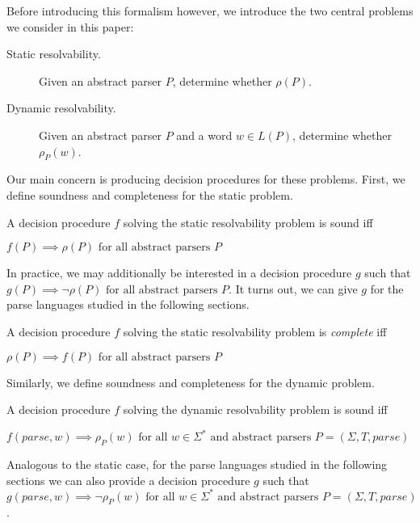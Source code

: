 \documentclass[acmsmall,review,anonymous]{acmart}\settopmatter{printfolios=true,printccs=false,printacmref=false}
\newcommand{\T}{\Sigma} %
\newcommand{\parse}{\mathit{parse}} %
\begin{document}
Before introducing this formalism however, we introduce the two central problems we consider in this paper:

\begin{description}
\item[Static resolvability.] Given an abstract parser $P$, determine whether $\rho(P)$.
\item[Dynamic resolvability.] Given an abstract parser $P$ and a word $w \in L(P)$, determine whether $\rho_P(w)$.
\end{description}

\noindent Our main concern is producing decision procedures for these problems. First, we define soundness and completeness for the static problem.

\begin{definition}\label{def:static-procedure}
  A decision procedure $f$ solving the static resolvability problem is sound iff

  $f(P) \implies \rho(P) \text{ for all abstract parsers } P$
\end{definition}

In practice, we may additionally be interested in a decision procedure
$g$ such that $g(P) \implies \lnot \rho(P) \text{ for all abstract
  parsers } P$. It turns out, we can give $g$ for the parse languages
studied in the following sections.

\begin{definition}
  A decision procedure $f$ solving the static resolvability problem is \emph{complete} iff

  $\rho(P) \implies f(P) \text{ for all abstract parsers } P$
\end{definition}


\noindent Similarly, we define soundness and completeness for the dynamic problem.

\begin{definition}\label{def:dynamic-procedure}
  A decision procedure $f$ solving the dynamic resolvability problem is sound iff

  $f(\parse, w) \implies \rho_P(w) \text{ for all } w \in \Sigma^{*} \text{ and abstract parsers } P = (\T, T, \parse)$
\end{definition}

Analogous to the static case, for the parse languages studied in the
following sections we can also provide a decision procedure $g$ such
that $g(\parse, w) \implies \lnot \rho_P(w) \text{ for all } w \in
\Sigma^{*} \text{ and abstract parsers } P = (\T, T, \parse)$.
\end{document}
